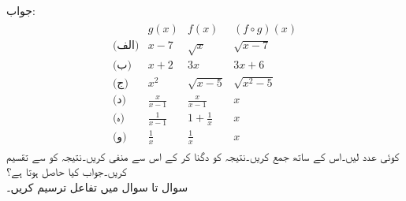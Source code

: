 جواب:
\begin{align*}
\begin{array}{cccc}
&g(x)&f(x)&(f\circ g)(x)\\
\hline
\text{(الف)} & x-7& \sqrt{x}&\sqrt{x-7}\\
\text{(ب)}&x+2&3x&3x+6\\
\text{(ج)} &x^2 &\sqrt{x-5}&\sqrt{x^2-5}\\
\text{(د)} &\frac{x}{x-1}&\frac{x}{x-1}&x\\
\text{(ہ)}& \frac{1}{x-1}&1+\frac{1}{x}&x\\
\text{(و)} &\frac{1}{x}&\frac{1}{x}&x
\end{array}
\end{align*}
کوئی عدد  لیں۔اس کے ساتھ  جمع کریں۔نتیجہ کو دگنا کر کے اس سے  منفی کریں۔نتیجہ کو  سے تقسیم کریں۔جواب کیا حاصل ہوتا ہے؟
\\

سوال  تا سوال  میں تفاعل ترسیم کریں۔

